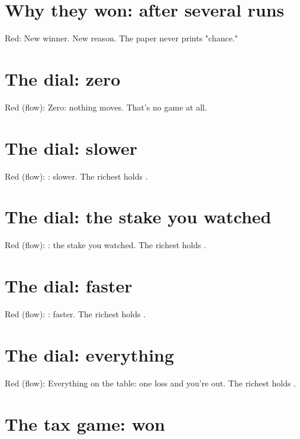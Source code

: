 \section{Why they won: after several runs}\label{why:again}

Red: New winner. New reason.
The paper never prints "chance."



\section{The dial: zero}\label{dial:zero}

Red (flow): Zero: nothing moves.
That's no game at all.

\section{The dial: slower}\label{dial:slow}

Red (flow): : slower.
The richest holds .

\section{The dial: the stake you watched}\label{dial:same}

Red (flow): : the stake you watched.
The richest holds .

\section{The dial: faster}\label{dial:fast}

Red (flow): : faster.
The richest holds .

\section{The dial: everything}\label{dial:all}

Red (flow): Everything on the table:
one loss and you're out. The richest holds .

\section{The tax game: won}\label{game:won}

